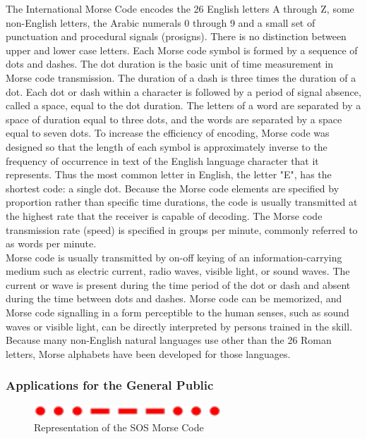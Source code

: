 \documentclass[14pt]{report}
\begin{document}
				The International Morse Code encodes the 26 English letters A through Z, some non-English letters, the Arabic numerals 0 through 9 and a small set of punctuation and procedural signals (prosigns). There is no distinction between upper and lower case letters. Each Morse code symbol is formed by a sequence of dots and dashes. The dot duration is the basic unit of time measurement in Morse code transmission. The duration of a dash is three times the duration of a dot. Each dot or dash within a character is followed by a period of signal absence, called a space, equal to the dot duration. The letters of a word are separated by a space of duration equal to three dots, and the words are separated by a space equal to seven dots. To increase the efficiency of encoding, Morse code was designed so that the length of each symbol is approximately inverse to the frequency of occurrence in text of the English language character that it represents. Thus the most common letter in English, the letter "E", has the shortest code: a single dot. Because the Morse code elements are specified by proportion rather than specific time durations, the code is usually transmitted at the highest rate that the receiver is capable of decoding. The Morse code transmission rate (speed) is specified in groups per minute, commonly referred to as words per minute.\\
				
				Morse code is usually transmitted by on-off keying of an information-carrying medium such as electric current, radio waves, visible light, or sound waves. The current or wave is present during the time period of the dot or dash and absent during the time between dots and dashes. Morse code can be memorized, and Morse code signalling in a form perceptible to the human senses, such as sound waves or visible light, can be directly interpreted by persons trained in the skill.\\

				Because many non-English natural languages use other than the 26 Roman letters, Morse alphabets have been developed for those languages.\\

				\subsubsection{Applications for the General Public}

					\begin{figure}[h]
						\includegraphics[width=7cm]{SOS - Morse.png}
						\centering
						\caption{Representation of the SOS Morse Code}
					\end{figure}
\end{document}
